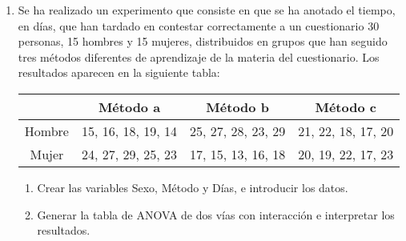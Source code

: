\begin{enumerate}
\begin{enumerate}
\begin{indicacion}
{/EMMEANS=TABLES(Dieta*Fármaco) COMPARE(Fármaco) ADJ(BONFERRONI)

Y también hay que añadir una línea más justo a continuación de la anterior:

/EMMEANS=TABLES(Fármaco*Dieta) COMPARE(Dieta) ADJ(BONFERRONI)


Una vez hechos los cambios, se marca todo el texto arrastrando el ratón y se ejecutan los comandos seleccionados con el menú \texttt{Ejecutar\flecha Selección}. Con ello, se obtienen todas las comparaciones junto con sus intervalos de confianza.


}
\end{indicacion}

\end{enumerate}

\item Se ha realizado un experimento que consiste en que se ha anotado el tiempo, en días, que han tardado en contestar correctamente a un cuestionario 30 personas, 15 hombres y 15 mujeres, distribuidos en grupos que han seguido tres métodos diferentes de aprendizaje de la materia del cuestionario. Los resultados aparecen en la siguiente tabla:

\begin{center}

\begin{tabular}{|l|l|l|l|}
\cline{2-4}
\multicolumn{1}{c|}{} & \multicolumn{1}{c|}{Método a } & \multicolumn{1}{c|}{Método b} & \multicolumn{1}{c|}{Método c} \\
\hline
\multicolumn{1}{|c|}{Hombre} & \multicolumn{1}{c|}{15, 16, 18, 19, 14} & \multicolumn{1}{c|}{25, 27, 28, 23, 29} & \multicolumn{1}{c|}{21, 22, 18, 17, 20} \\
\hline
\multicolumn{1}{|c|}{Mujer} & \multicolumn{1}{c|}{24, 27, 29, 25, 23} & \multicolumn{1}{c|}{17, 15, 13, 16, 18} & \multicolumn{1}{c|}{20, 19, 22, 17, 23} \\
\hline
\end{tabular}

\end{center}

\begin{enumerate}

\item Crear las variables Sexo, Método y Días, e introducir los datos.

\item Generar la tabla de ANOVA de dos vías con interacción e interpretar los resultados.


\end{enumerate}
\end{enumerate}
